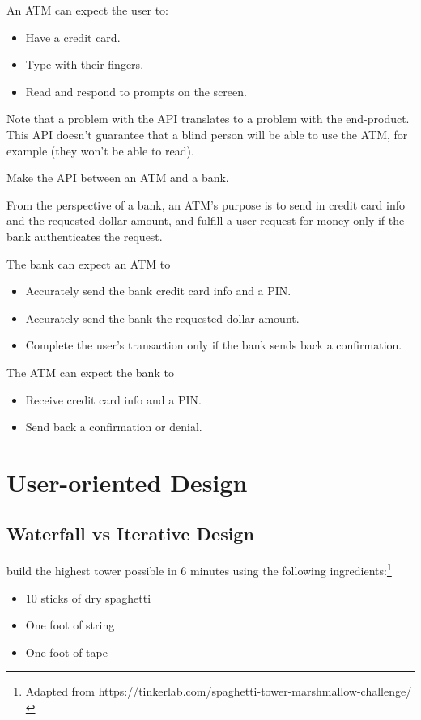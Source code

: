 An ATM can expect the user to:
\begin{itemize}
	\item Have a credit card.
	\item Type with their fingers.
	\item Read and respond to prompts on the screen.
\end{itemize}

Note that a problem with the API translates to a problem with the end-product. This API doesn't guarantee that a blind person will be able to use the ATM, for example (they won't be able to read). 

\begin{example}
Make the API between an ATM and a bank.
\end{example}

From the perspective of a bank, an ATM's purpose is to send in credit card info and the requested dollar amount, and fulfill a user request for money only if the bank authenticates the request. 

The bank can expect an ATM to
\begin{itemize}
	\item Accurately send the bank credit card info and a PIN.
	\item Accurately send the bank the requested dollar amount.
	\item Complete the user's transaction only if the bank sends back a confirmation.
\end{itemize}

The ATM can expect the bank to
\begin{itemize}
	\item Receive credit card info and a PIN.
	\item Send back a confirmation or denial.
\end{itemize}

\section{User-oriented Design}

\subsection{Waterfall vs Iterative Design}

\begin{example}
build the highest tower possible in 6 minutes using the following ingredients:\footnote{Adapted from https://tinkerlab.com/spaghetti-tower-marshmallow-challenge/}
\begin{itemize}
	\item 10 sticks of dry spaghetti
	\item One foot of string
	\item One foot of tape
\end{itemize}
\end{example}

